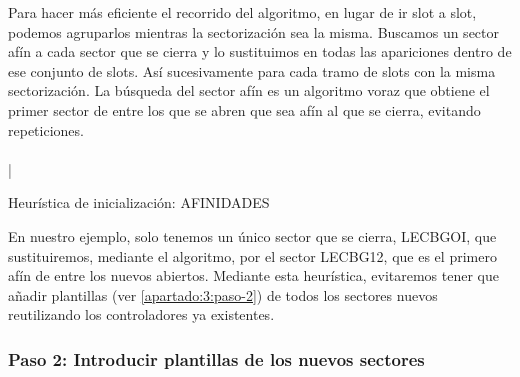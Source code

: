 Para hacer más eficiente el recorrido del algoritmo, en lugar de ir slot a slot, podemos agruparlos mientras la sectorización sea la misma. Buscamos un sector afín a cada sector que se cierra y lo sustituimos en todas las apariciones dentro de ese conjunto de slots. Así sucesivamente para cada tramo de slots con la misma sectorización. 
La búsqueda del sector afín es un algoritmo voraz que obtiene el primer sector de entre los que se abren que sea afín al que se cierra, evitando repeticiones.
\\
\\|
\begin{algorithm}[H]
	\DontPrintSemicolon
	\medskip
	
	
	\caption{Heurística de inicialización: AFINIDADES}
\end{algorithm}


En nuestro ejemplo, solo tenemos un único sector que se cierra, LECBGOI, que sustituiremos, mediante el algoritmo, por el sector LECBG12, que es el primero afín de entre los nuevos abiertos. Mediante esta heurística, evitaremos tener que añadir plantillas (ver \autoref{apartado:3:paso-2}) de todos los sectores nuevos reutilizando los controladores ya existentes.

\subsubsection{Paso 2: Introducir plantillas de los nuevos sectores} \label{apartado:3:paso-2}

